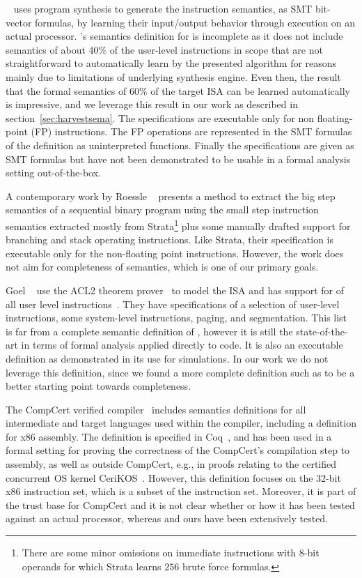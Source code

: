 \Strata~\cite{Heule2016a} uses program synthesis to generate the instruction
semantics, as SMT bit-vector formulas, by learning their input/output behavior
through execution on an actual processor. \Strata's semantics definition for
\ISA is incomplete as it does not include semantics of about 40\% of the
user-level instructions in scope that are not straightforward to automatically learn by the presented algorithm for reasons mainly due to limitations of underlying synthesis engine. Even then,
the result that the formal semantics of 60\% of the target \ISA ISA can be learned automatically
is impressive, and we leverage this result in our work as described in
section~\ref{sec:harvestsema}.
The specifications are executable only for non floating-point (FP) instructions.
The FP operations are represented in the SMT formulas of the definition as
uninterpreted functions. Finally the specifications are given as SMT formulas
but have not been demonstrated to be usable in a formal analysis setting out-of-the-box.

A contemporary work by Roessle \etal~\cite{Roessle:CPP19} presents a method to extract the big step semantics of a sequential binary program using the small step instruction semantics extracted mostly from Strata\footnote{There are some minor omissions on immediate instructions with $8$-bit operands for which Strata learns $256$ brute force formulas.} plus some manually drafted support for branching and stack operating instructions. Like Strata, their specification is executable only for the non-floating point instructions. However, the work does not aim for completeness of semantics, which is one of our primary goals. 

Goel \etal~\cite{Goel:FMCAD14} use the ACL2 theorem prover~\cite{ACL2:Kaufmann2000} to model the \ISA ISA and has support for
\goelPerc{} of all user level instructions~\cite{GoelList}. They have specifications of a selection
of user-level instructions, some system-level instructions, paging, and
segmentation. This list is far from a complete semantic definition of \ISA,
however it is still the state-of-the-art in terms of formal analysis applied
directly to \ISA code. It is also an executable definition as demonstrated in
its use for simulations. In our work we do not leverage this definition, since
we found a more complete definition such as \Strata to be a better starting
point towards completeness.

The CompCert verified compiler~\cite{Leroy:2009} includes semantics
definitions for all intermediate and target languages used within the compiler,
including a definition for x86 assembly. The definition is specified in Coq~\cite{Coq}, and has been used in a formal
setting for proving the correctness of the CompCert's compilation step to assembly,
as well as outside CompCert, e.g., in proofs relating to the certified concurrent
OS kernel CeriKOS~\cite{Gu:2016}. However, this definition focuses on the
32-bit x86 instruction set, which is a subset of the \ISA instruction 
set.
Moreover, it is part of the trust base for CompCert and it is not clear
whether or how it has been tested against an actual processor, whereas
\Strata and ours have been extensively tested.

